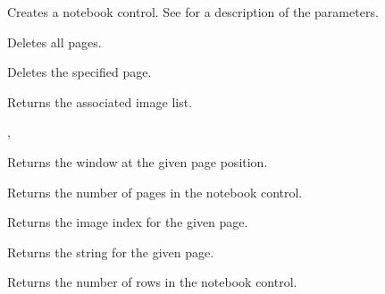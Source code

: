 Creates a notebook control. See  for a description
of the parameters.

\label{wxnotebookdeleteallpages}


Deletes all pages.

\label{wxnotebookdeletepage}


Deletes the specified page.

\label{wxnotebookgetimagelist}


Returns the associated image list.


, 

\label{wxnotebookgetpage}


Returns the window at the given page position.

\label{wxnotebookgetpagecount}


Returns the number of pages in the notebook control.

\label{wxnotebookgetpageimage}


Returns the image index for the given page.

\label{wxnotebookgetpagetext}


Returns the string for the given page.

\label{wxnotebookgetrowcount}


Returns the number of rows in the notebook control.

\label{wxnotebookgetselection}

